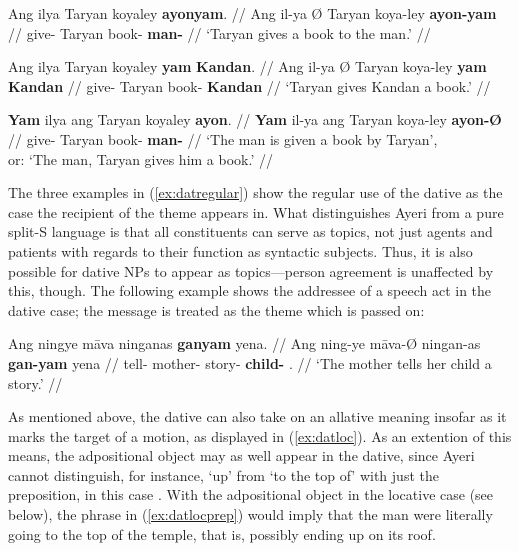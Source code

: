 \pex\label{ex:datregular}
\a\begingl
	\gla Ang ilya {} Taryan koyaley \textbf{ayonyam}. //
	\glb Ang il-ya Ø Taryan koya-ley \textbf{ayon-yam} //
	\glc \AgtT{} give-\TsgM{} \Top{} Taryan book-\PargI{} 
		\textbf{man-\Dat{}} //
	\glft `Taryan gives a book to the man.' //
\endgl

\a\begingl
	\gla Ang ilya {} Taryan koyaley \textbf{yam} \textbf{Kandan}. //
	\glb Ang il-ya Ø Taryan koya-ley \textbf{yam} \textbf{Kandan} //
	\glc \AgtT{} give-\TsgM{} \Top{} Taryan book-\PargI{} \textbf{\Dat{}} 
		\textbf{Kandan} //
	\glft `Taryan gives Kandan a book.' //
\endgl

\a\begingl
	\gla \textbf{Yam} ilya ang Taryan koyaley \textbf{ayon}. //
	\glb \textbf{Yam} il-ya ang Taryan koya-ley \textbf{ayon-Ø} //
	\glc \textbf{\DatT{}} give-\TsgM{} \Aarg{} Taryan book-\PargI{} 
		\textbf{man-\Top{}} //
	\glft `The man is given a book by Taryan',\\
		or: `The man, Taryan gives him a book.' //
\endgl

\xe

The three examples in (\ref{ex:datregular}) show the regular use of the dative 
as the case the recipient of the theme appears in. What distinguishes Ayeri 
from a pure split-S language is that all constituents can serve as topics, not 
just agents and patients with regards to their function as syntactic subjects. 
Thus, it is also possible for dative NPs to appear as topics---person 
agreement is unaffected by this, though. The following example shows the 
addressee of a speech act in the dative case; the message is treated as the 
theme which is passed on:

\ex
\begingl
	\gla Ang ningye māva ninganas \textbf{ganyam} yena. //
	\glb Ang ning-ye māva-Ø ningan-as \textbf{gan-yam} yena //
	\glc \AgtT{} tell-\TsgF{} mother-\Top{} story-\Parg{} 
		\textbf{child-\Dat{}} \TsgF{}.\Gen{} //
	\glft `The mother tells her child a story.' //
\endgl
\xe

As mentioned above, the dative can also take on an allative meaning insofar as 
it marks the target of a motion, as displayed in (\ref{ex:datloc}). As an 
extention of this means, the adpositional object may as well appear in the 
dative, since Ayeri cannot distinguish, for instance, `up' from `to the top of' 
with just the preposition, in this case . With the 
adpositional object in the locative case (see below), the phrase in 
(\ref{ex:datlocprep}) would imply that the man were literally going to the top 
of the temple, that is, possibly ending up on its roof.

